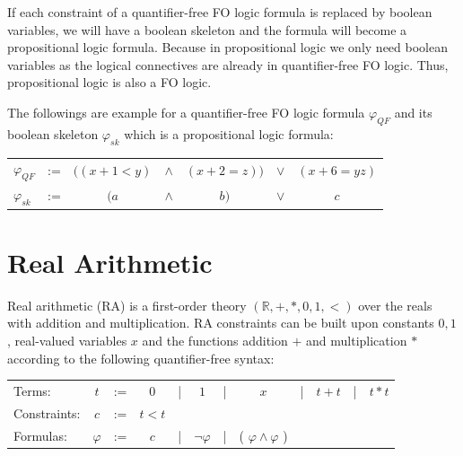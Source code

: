 \noindent If each constraint of a quantifier-free FO logic formula is replaced by boolean variables, we will have a boolean skeleton and the formula will become a propositional logic formula.
Because in propositional logic we only need boolean variables as the logical connectives are already in quantifier-free FO logic.
Thus, propositional logic is also a FO logic.\newline

\begin{example}
    The followings are example for a quantifier-free FO logic formula $\varphi_{QF}$ and its boolean skeleton $\varphi_{sk}$ which is a propositional logic formula:
    \begin{table}[!ht]
    \centering
    \begin{tabular}{lcccccc}
    $\varphi_{QF}$ & := & $((x + 1 < y)$ & $\wedge$ & $(x + 2 = z))$ & $\vee$ & $(x + 6 = yz)$ \\
    $\varphi_{sk}$  & := & $(a$            & $\wedge$ & $b)$            & $\vee$ & $c$           
    \end{tabular}
    \end{table}
\end{example}
\section{Real Arithmetic}
\label{sec:Real_Arithmetic}
Real arithmetic (RA) is a first-order theory $(\mathbb{R}, +, \ast, 0, 1, <)$ over the reals with addition and multiplication. 
RA constraints can be built upon constants $0, 1$, real-valued variables $x$ and the functions addition $+$ and multiplication $\ast$ according to the following quantifier-free syntax:\newline

\begin{table}[!ht]
\begin{tabular}{lccccccccccc}
\centering
Terms:       & $t$       & := & $0$   & | & $1$            & | & $x$                          & | & $t+t$ & | & $t \ast t$ \\
Constraints: & $c$       & := & $t<t$ &   &                &   &                              &   &       &   &             \\
Formulas:    & $\varphi$ & := & $c$   & | & $\neg \varphi$ & | & ( $\varphi \wedge \varphi$ ) &   &       &   &           
\end{tabular}
\end{table}


